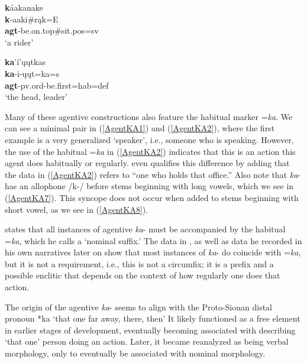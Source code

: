 \begin{exe}
\begin{xlist}
	\item\label{AgentKA7} \glll \textbf{k}áakanake\\
	\textbf{k}-aaki\#rąk=E\\
	\textbf{agt}-\textnormal{be.on.top}\#sit.pos=sv\\
	\glt `a rider' \citep[15]{kennard1936}
	
	\item\label{AgentKA8} \glll \textbf{ka}'í'ųųtkas\\
	\textbf{ka}-i-ųųt=ka=s\\
	\textbf{agt}-pv.ord-\textnormal{be.first}=hab=def\\
	\glt `the head, leader' \citep[249]{trechter2012}
    
    \end{xlist}

\end{exe}

Many of these agentive constructions also feature the habitual marker =\textit{ka}. We can see a minimal pair in (\ref{AgentKA1}) and (\ref{AgentKA2}), where the first example is a very generalized `speaker', i.e., someone who is speaking. However, the use of the habitual =\textit{ka} in (\ref{AgentKA2}) indicates that this is an action this agent does habitually or regularly. \citet[15]{kennard1936} even qualifies this difference by adding that the data in (\ref{AgentKA2}) refers to ``one who holds that office.'' Also note that \textit{ka}- has an allophone /k-/ before stems beginning with long vowels, which we see in (\ref{AgentKA7}). This syncope does not occur when added to stems beginning with short vowel, as we see in (\ref{AgentKA8}).

\citet[441]{hollow1970} states that all instances of agentive \textit{ka}- must be accompanied by the habitual =\textit{ka}, which he calls a `nominal suffix.' The data in \citet{kennard1934, kennard1936}, as well as data he recorded in his own narratives later on \citep{hollow1973a,hollow1973b} show that most instances of \textit{ka}- do coincide with =\textit{ka}, but it is not a requirement, i.e., this is not a circumfix; it is a prefix and a possible enclitic that depends on the context of how regularly one does that action.

The origin of the agentive \textit{ka}- seems to align with the Proto-Siouan distal pronoun *ka `that one far away, there, then' It likely functioned as a free element in earlier stages of development, eventually becoming associated with describing `that one' person doing an action. Later, it became reanalyzed as being verbal morphology, only to eventually be associated with nominal morphology. %

